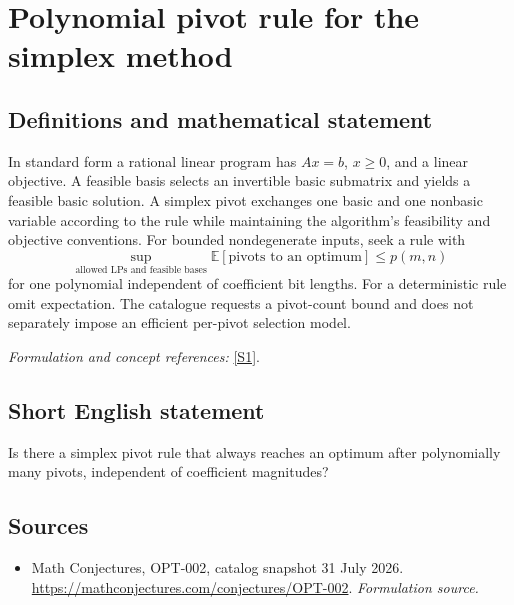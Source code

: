 \documentclass[11pt]{article}
\begin{document}
\section*{\texorpdfstring{Polynomial pivot rule for the simplex method}{Polynomial pivot rule for the simplex method}}\label{30006742}
\subsection{Definitions and mathematical statement}
In standard form a rational linear program has $Ax=b$, $x\ge0$, and a linear objective. A feasible basis selects an invertible basic submatrix and yields a feasible basic solution. A simplex pivot exchanges one basic and one nonbasic variable according to the rule while maintaining the algorithm's feasibility and objective conventions. For bounded nondegenerate inputs, seek a rule with
\[
 \sup_{\text{allowed LPs and feasible bases}}\mathbb E[\text{pivots to an optimum}]
 \le p(m,n)
\]
for one polynomial independent of coefficient bit lengths. For a deterministic rule omit expectation. The catalogue requests a pivot-count bound and does not separately impose an efficient per-pivot selection model.
\par\smallskip\textit{Formulation and concept references:} \href{https://mathconjectures.com/conjectures/OPT-002}{[S1]}.

\subsection{Short English statement}
Is there a simplex pivot rule that always reaches an optimum after polynomially many pivots, independent of coefficient magnitudes?
\subsection{Sources}
\begin{itemize}
\item[S1]Math Conjectures, OPT-002, catalog snapshot 31 July 2026.
\url{https://mathconjectures.com/conjectures/OPT-002}.
\textit{Formulation source.}
\end{itemize}
\end{document}
